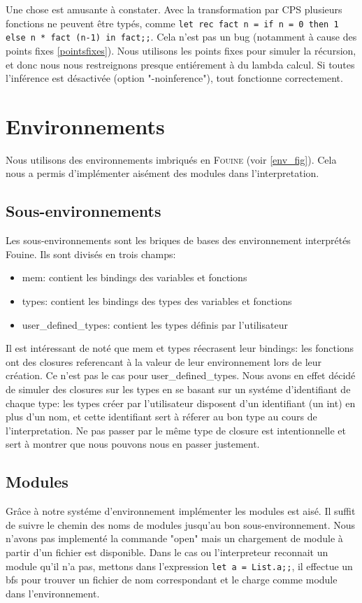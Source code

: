 \documentclass[paper=a4, fontsize=11pt, twocolumn]{article}
\begin{document}
Une chose est amusante à constater. Avec la transformation par CPS plusieurs fonctions ne peuvent être typés, comme \texttt{let rec fact n = if n = 0 then 1 else n * fact (n-1) in fact;;}. Cela n'est pas un bug (notamment à cause des points fixes \ref{pointsfixes}). Nous utilisons les points fixes pour simuler la récursion, et donc nous nous restreignons presque entiérement à du lambda calcul. Si toutes l'inférence est désactivée (option "-noinference"), tout fonctionne correctement.

\section{Environnements}
Nous utilisons des environnements imbriqués en \textsc{Fouine} (voir \ref{env_fig}). Cela nous a permis d'implémenter aisément des modules dans l'interpretation.

\subsection{Sous-environnements}
Les sous-environnements sont les briques de bases des environnement interprétés Fouine. Ils sont divisés en trois champs:
\begin{itemize}
	\item mem: contient les bindings des variables et fonctions
	\item types: contient les bindings des types des variables et fonctions
	\item user\_defined\_types: contient les types définis par l'utilisateur
\end{itemize}

Il est intéressant de noté que mem et types réecrasent leur bindings: les fonctions ont des closures referencant à la valeur de leur environnement lors de leur création. Ce n'est pas le cas pour user\_defined\_types. Nous avons en effet décidé de simuler des closures sur les types en se basant sur un systéme d'identifiant de chaque type: les types créer par l'utilisateur disposent d'un identifiant (un int) en plus d'un nom, et cette identifiant sert à réferer au bon type au cours de l'interpretation. Ne pas passer par le même type de closure est intentionnelle et sert à montrer que nous pouvons nous en passer justement.

\subsection{Modules}
Grâce à notre systéme d'environnement implémenter les modules est aisé. Il suffit de suivre le chemin des noms de modules jusqu'au bon sous-environnement. 
Nous n'avons pas implementé la commande "open" mais un chargement de module à partir d'un fichier est disponible. Dans le cas ou l'interpreteur reconnait un module qu'il n'a pas, mettons dans l'expression \texttt{let a = List.a;;}, il effectue un bfs pour trouver un fichier de nom correspondant et le charge comme module dans l'environnement.
\end{document}
